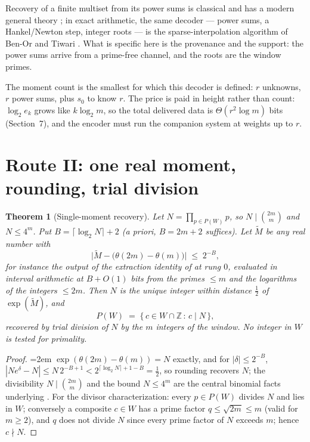 \documentclass[11pt]{article}
\newtheorem{theorem}{Theorem}
\theoremstyle{remark}
\begin{document}
Recovery of a finite multiset from its power sums is classical and has a modern general theory
\cite{MSW}; in exact arithmetic, the same decoder --- power sums, a Hankel/Newton step, integer
roots --- is the sparse-interpolation algorithm of Ben-Or and Tiwari \cite{BOT}. What is specific
here is the provenance and the support: the power sums arrive from a prime-free channel, and the
roots are the window primes.

The moment count is the smallest for which this decoder is defined: $r$ unknowns, $r$ power sums, plus
$s_0$ to know $r$. The price is paid in height rather than count: $\log_2 e_k$ grows like
$k \log_2 m$, so the total delivered data is $\Theta(r^2 \log m)$ bits (Section~7), and the encoder
must run the companion system at weights up to $r$.

\section{Route II: one real moment, rounding, trial division}

\begin{theorem}[Single-moment recovery]\label{thm:prod}
Let $N = \prod_{p \in P(W)} p$, so $N \mid \binom{2m}{m}$ and $N \le 4^m$. Put
$B = \lceil \log_2 N \rceil + 2$ (a priori, $B = 2m + 2$ suffices). Let $\widetilde{M}$ be any real
number with
\[
\bigl|\widetilde{M} - \big(\theta(2m) - \theta(m)\big)\bigr| \;\le\; 2^{-B},
\]
for instance the output of the extraction identity of \cite[Prop.~1]{CompanionII} at rung $0$,
evaluated in interval arithmetic at $B + O(1)$ bits from the primes $\le m$ and the logarithms of the
integers $\le 2m$. Then $N$ is the unique integer within distance $\tfrac12$ of
$\exp(\widetilde{M})$, and
\[
P(W) \;=\; \{\, c \in W \cap \mathbb{Z} \,:\, c \mid N \,\},
\]
recovered by trial division of $N$ by the $m$ integers of the window. No integer in $W$ is tested for
primality.
\end{theorem}

\begin{proof}
{\emergencystretch=2em
$\exp(\theta(2m) - \theta(m)) = N$ exactly, and for $|\delta| \le 2^{-B}$,
$|N e^{\delta} - N| \le N\, 2^{-B+1} < 2^{\lceil \log_2 N\rceil + 1 - B} = \tfrac12$, so rounding
recovers $N$; the divisibility $N \mid \binom{2m}{m}$ and the bound $N \le 4^m$ are the central
binomial facts underlying \cite{Cheb,Erdos}. For the divisor characterization: every $p \in P(W)$ divides
$N$ and lies in $W$; conversely a composite $c \in W$ has a prime factor $q \le \sqrt{2m} \le m$
(valid for $m \ge 2$), and $q$ does not divide $N$ since every prime factor of $N$ exceeds $m$; hence
$c \nmid N$.\par}
\end{proof}
\end{document}
